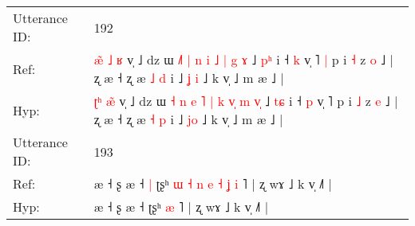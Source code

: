 \documentclass[10pt]{article}
\DeclareRobustCommand{\hl}[1]{{\textcolor{red}{#1}}}
\begin{document}
\begin{longtable}{ll}
 \\
\midrule
Utterance ID: & 192 \\
Ref: & \hl{æ}\hl{̃} \hl{˩}\hl{ }\hl{ʁ} v̩ ˩ dz ɯ \hl{}\hl{˩}\hl{˥} \hl{|} \hl{n} \hl{i} \hl{˩} \hl{}\hl{|} \hl{g} \hl{}\hl{ɤ} ˩ \hl{p}\hl{ʰ} i ˧ \hl{k} v̩ ˥\hl{ }\hl{|} p i \hl{˧} z \hl{o} ˩ | ʐ æ ˧ ʐ æ \hl{˩} \hl{d} i ˩ \hl{ʝ}\hl{ }\hl{i} ˩ k v̩ ˩ m æ ˩ |
 \\
Hyp: & \hl{ʈ}\hl{ʰ} \hl{}\hl{æ}\hl{̃} v̩ ˩ dz ɯ \hl{˧}\hl{ }\hl{n} \hl{e} \hl{˥} \hl{|} \hl{k} \hl{v}\hl{̩} \hl{m} \hl{v}\hl{̩} ˩ \hl{t}\hl{ɕ} i ˧ \hl{p} v̩ ˥\hl{}\hl{} p i \hl{˩} z \hl{e} ˩ | ʐ æ ˧ ʐ æ \hl{˧} \hl{p} i ˩ \hl{}\hl{j}\hl{o} ˩ k v̩ ˩ m æ ˩ |
 \\
\midrule
Utterance ID: & 193 \\
Ref: & æ ˧ ʂ æ ˧\hl{ }\hl{|} ʈʂʰ\hl{ }\hl{ɯ}\hl{ }\hl{˧}\hl{ }\hl{n}\hl{ }\hl{e}\hl{ }\hl{˧}\hl{ }\hl{ʝ} \hl{i} ˥ | ʐ wɤ ˩ k v̩ ˩˥ |
 \\
Hyp: & æ ˧ ʂ æ ˧\hl{}\hl{} ʈʂʰ\hl{}\hl{}\hl{}\hl{}\hl{}\hl{}\hl{}\hl{}\hl{}\hl{}\hl{}\hl{} \hl{æ} ˥ | ʐ wɤ ˩ k v̩ ˩˥ |
 \\
\midrule
\end{longtable}
\end{document}
